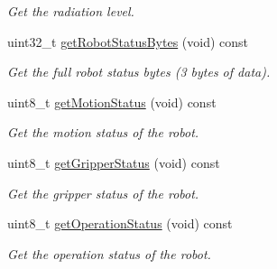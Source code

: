 \begin{DoxyCompactItemize}
\begin{DoxyCompactList}\small\item\em Get the radiation level. \end{DoxyCompactList}\item 
uint32\+\_\+t \hyperlink{class_robot_data_a9e8a44387275e115f71713210c8b0841}{get\+Robot\+Status\+Bytes} (void) const
\begin{DoxyCompactList}\small\item\em Get the full robot status bytes (3 bytes of data). \end{DoxyCompactList}\item 
uint8\+\_\+t \hyperlink{class_robot_data_a205c431df25f99c15f39e81fd6a58116}{get\+Motion\+Status} (void) const
\begin{DoxyCompactList}\small\item\em Get the motion status of the robot. \end{DoxyCompactList}\item 
uint8\+\_\+t \hyperlink{class_robot_data_a5438f77e1f7924adab982401225a2451}{get\+Gripper\+Status} (void) const
\begin{DoxyCompactList}\small\item\em Get the gripper status of the robot. \end{DoxyCompactList}\item 
uint8\+\_\+t \hyperlink{class_robot_data_a42b8405b817f03340f575f1ca97d2721}{get\+Operation\+Status} (void) const
\begin{DoxyCompactList}\small\item\em Get the operation status of the robot. \end{DoxyCompactList}\end{DoxyCompactItemize}
